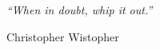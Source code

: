 \newlength\longest

\clearpage

\thispagestyle{empty}
\null\vfill

\settowidth{}
\begin{center}
    \parbox{\longest}{%
        \raggedright{\LARGE\itshape%
            ``When in doubt,
            whip it out.''\par\bigskip
        }
        \raggedleft\Large{Christopher Wistopher}\par%
    }
\end{center}


\vfill\vfill

\clearpage
